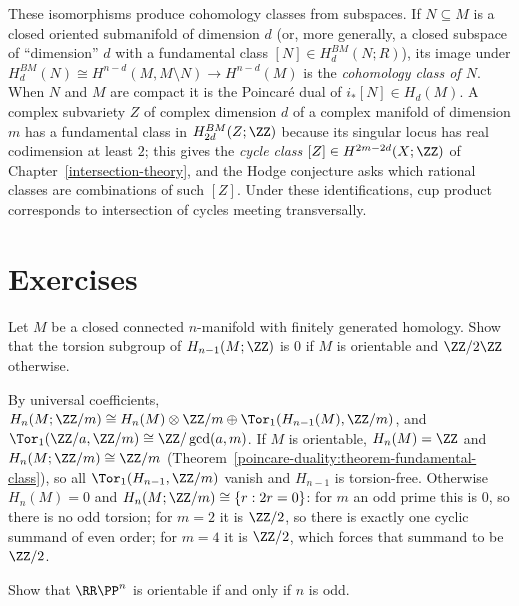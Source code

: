 \begin{remark}\label{poincare-duality:remark-fundamental-classes-subspaces}
These isomorphisms produce cohomology classes from subspaces. If $N \subseteq M$ is a closed oriented submanifold of dimension $d$ (or, more generally, a closed subspace of
``dimension'' $d$ with a fundamental class $[N] \in H^{BM}_d(N; R)$), its image under $H^{BM}_d(N) \cong H^{n-d}(M, M \setminus N) \to H^{n-d}(M)$ is the \emph{cohomology class of $N$}.
When $N$ and $M$ are compact it is the Poincar\'e dual of $i_*[N] \in H_d(M)$. A complex subvariety $Z$ of complex dimension $d$ of a complex manifold of dimension $m$ has a
fundamental class in $H^{BM}_{2d}(Z; \ZZ)$ because its singular locus has real codimension at least $2$; this gives the \emph{cycle class} $[Z] \in H^{2m-2d}(X; \ZZ)$ of
Chapter~\ref{intersection-theory}, and the Hodge conjecture asks which rational classes are combinations of such $[Z]$. Under these identifications, cup product corresponds to
intersection of cycles meeting transversally.
\end{remark}

\section{Exercises}\label{poincare-duality:section-exercises}

\begin{exercise}\label{poincare-duality:exercise-torsion-top}
Let $M$ be a closed connected $n$-manifold with finitely generated homology. Show that the torsion subgroup of $H_{n-1}(M; \ZZ)$ is $0$ if $M$ is orientable and $\ZZ/2\ZZ$ otherwise.
\end{exercise}

\begin{solution}
By universal coefficients, $H_n(M; \ZZ/m) \cong H_n(M) \otimes \ZZ/m \oplus \Tor_1(H_{n-1}(M), \ZZ/m)$, and $\Tor_1(\ZZ/a, \ZZ/m) \cong \ZZ/\gcd(a, m)$. If $M$ is orientable, $H_n(M) = \ZZ$ and
$H_n(M; \ZZ/m) \cong \ZZ/m$ (Theorem~\ref{poincare-duality:theorem-fundamental-class}), so all $\Tor_1(H_{n-1}, \ZZ/m)$ vanish and $H_{n-1}$ is torsion-free. Otherwise $H_n(M) = 0$ and
$H_n(M; \ZZ/m) \cong \{r : 2r = 0\}$: for $m$ an odd prime this is $0$, so there is no odd torsion; for $m = 2$ it is $\ZZ/2$, so there is exactly one cyclic summand of even order; for
$m = 4$ it is $\ZZ/2$, which forces that summand to be $\ZZ/2$.
\end{solution}

\begin{exercise}\label{poincare-duality:exercise-projective-orientability}
Show that $\RR\PP^n$ is orientable if and only if $n$ is odd.
\end{exercise}

